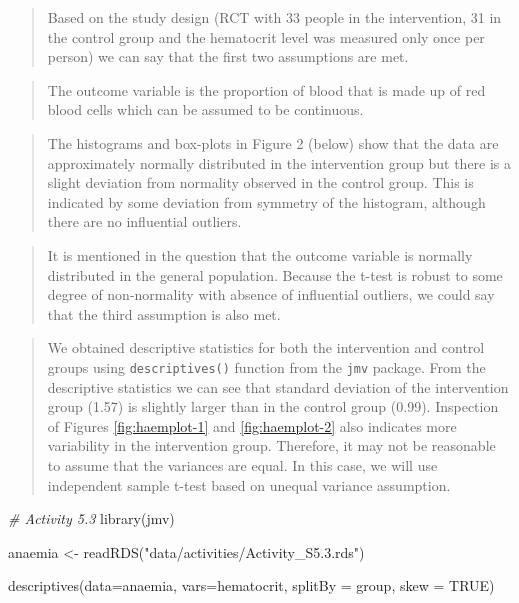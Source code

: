 \documentclass[
]{memoir}
\newenvironment{Shaded}{\begin{snugshade}}{\end{snugshade}}
\newcommand{\AttributeTok}[1]{\textcolor[rgb]{0.77,0.63,0.00}{#1}}
\newcommand{\CommentTok}[1]{\textcolor[rgb]{0.56,0.35,0.01}{\textit{#1}}}
\newcommand{\ConstantTok}[1]{\textcolor[rgb]{0.00,0.00,0.00}{#1}}
\newcommand{\FunctionTok}[1]{\textcolor[rgb]{0.00,0.00,0.00}{#1}}
\newcommand{\NormalTok}[1]{#1}
\newcommand{\OtherTok}[1]{\textcolor[rgb]{0.56,0.35,0.01}{#1}}
\newcommand{\StringTok}[1]{\textcolor[rgb]{0.31,0.60,0.02}{#1}}
\begin{document}
\begin{quote}
Based on the study design (RCT with 33 people in the intervention, 31 in the control group and the hematocrit level was measured only once per person) we can say that the first two assumptions are met.
\end{quote}

\begin{quote}
The outcome variable is the proportion of blood that is made up of red blood cells which can be assumed to be continuous.
\end{quote}

\begin{quote}
The histograms and box-plots in Figure 2 (below) show that the data are approximately normally distributed in the intervention group but there is a slight deviation from normality observed in the control group. This is indicated by some deviation from symmetry of the histogram, although there are no influential outliers.
\end{quote}

\begin{quote}
It is mentioned in the question that the outcome variable is normally distributed in the general population. Because the t-test is robust to some degree of non-normality with absence of influential outliers, we could say that the third assumption is also met.
\end{quote}

\begin{quote}
We obtained descriptive statistics for both the intervention and control groups using \texttt{descriptives()} function from the \texttt{jmv} package. From the descriptive statistics we can see that standard deviation of the intervention group (1.57) is slightly larger than in the control group (0.99). Inspection of Figures \ref{fig:haemplot-1} and \ref{fig:haemplot-2} also indicates more variability in the intervention group. Therefore, it may not be reasonable to assume that the variances are equal. In this case, we will use independent sample t-test based on unequal variance assumption.
\end{quote}

\begin{Shaded}
\begin{Highlighting}[]
\CommentTok{\# Activity 5.3}
\FunctionTok{library}\NormalTok{(jmv)}

\NormalTok{anaemia }\OtherTok{\textless{}{-}} \FunctionTok{readRDS}\NormalTok{(}\StringTok{"data/activities/Activity\_S5.3.rds"}\NormalTok{)}

\FunctionTok{descriptives}\NormalTok{(}\AttributeTok{data=}\NormalTok{anaemia, }\AttributeTok{vars=}\NormalTok{hematocrit,}
             \AttributeTok{splitBy =}\NormalTok{ group,}
             \AttributeTok{skew =} \ConstantTok{TRUE}\NormalTok{)}
\end{Highlighting}
\end{Shaded}
\end{document}
